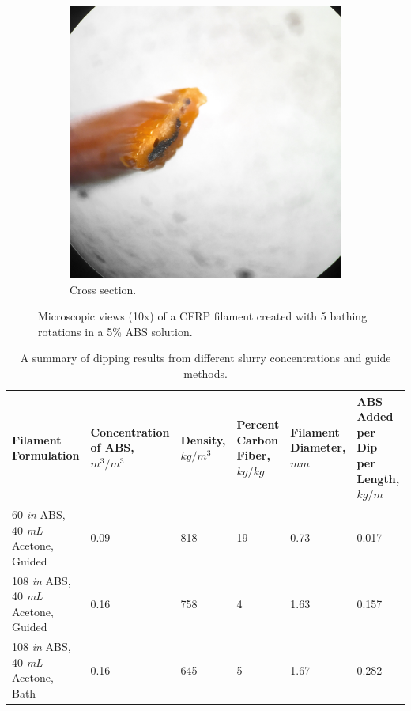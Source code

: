 \begin{figure}[h!]
\begin{subfigure}[b]{0.45\textwidth}
                \includegraphics[width=\textwidth]{./figures/filament-108-40-flat-end}
                \caption{Cross section.}
                \label{fig:filament-108-40-flat-end}
        \end{subfigure}
        \caption{Microscopic views (10x) of a CFRP filament created with 5 bathing rotations in a 5\% ABS solution.}\label{fig:filament-108-40-bath-microscope}
\end{figure}



\begin{table}[h!]
    \centering
    \begin{tabular}{p{1.5in}|p{1in}|p{0.75in}|p{0.75in}|p{0.75in}|p{0.75in}}
        Filament Formulation & Concentration of ABS, $m^3/m^3$ & Density, $kg/m^3$ & Percent Carbon Fiber, $kg/kg$ & Filament Diameter, $mm$ & ABS Added per Dip per Length, $kg/m$  \\ \hline \hline
        60 \textit{in} ABS, 40 \textit{mL} Acetone, Guided & 0.09 & 818 & 19 & 0.73 & 0.017 \\ \hline
        108 \textit{in} ABS, 40 \textit{mL} Acetone, Guided & 0.16 & 758 & 4 & 1.63 & 0.157 \\ \hline
        108 \textit{in} ABS, 40 \textit{mL} Acetone, Bath & 0.16 & 645 & 5 & 1.67 & 0.282 \\
 
    \end{tabular}
    \caption{A summary of dipping results from different slurry concentrations and guide methods.}
    \label{tab:dipping-results}
\end{table}


